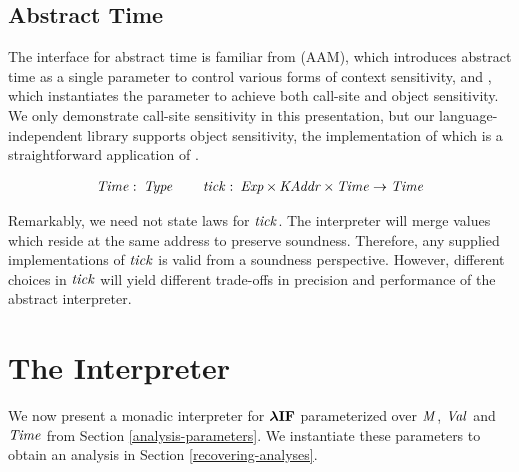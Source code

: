 \par

\subsection{Abstract Time}\label{abstract-time}

\par

The interface for abstract time is familiar from
\citet{davdar:van-horn:2010:aam} (AAM), which introduces abstract time
as a single parameter to control various forms of context sensitivity,
and \citet{dvanhorn:Smaragdakis2011Pick}, which instantiates the
parameter to achieve both call-site and object sensitivity. We only
demonstrate call-site sensitivity in this presentation, but our
language-independent library supports object sensitivity, the
implementation of which is a straightforward application of
\citet{dvanhorn:Smaragdakis2011Pick}.

\small\begin{alignat*}{1}
 \operatorname{\mathit{Time}}   \mathbin{\colon}   \operatorname{\mathit{Type}}   \hspace{1em}  \hspace{1em}   \operatorname{\mathit{tick}}   \mathbin{\colon}   \operatorname{\mathit{Exp}}   \times   \operatorname{\mathit{KAddr}}   \times   \operatorname{\mathit{Time}}   \rightarrow   \operatorname{\mathit{Time}} 
\end{alignat*}\normalsize

Remarkably, we need not state laws for $ \operatorname{\mathit{tick}} $. The interpreter
will merge values which reside at the same address to preserve
soundness. Therefore, any supplied implementations of $ \operatorname{\mathit{tick}} $ is
valid from a soundness perspective. However, different choices in
$ \operatorname{\mathit{tick}} $ will yield different trade-offs in precision and
performance of the abstract interpreter.

\par

\section{The Interpreter}\label{the-interpreter}

\par

We now present a monadic interpreter for $ \operatorname{\mathtt{\boldsymbol{\mathbf{\lambda{}IF}}}} $
parameterized over $ \operatorname{\mathit{M}} $, $ \operatorname{\mathit{Val}} $ and $ \operatorname{\mathit{Time}} $ from
Section \ref{analysis-parameters}. We instantiate these parameters to
obtain an analysis in Section \ref{recovering-analyses}.

